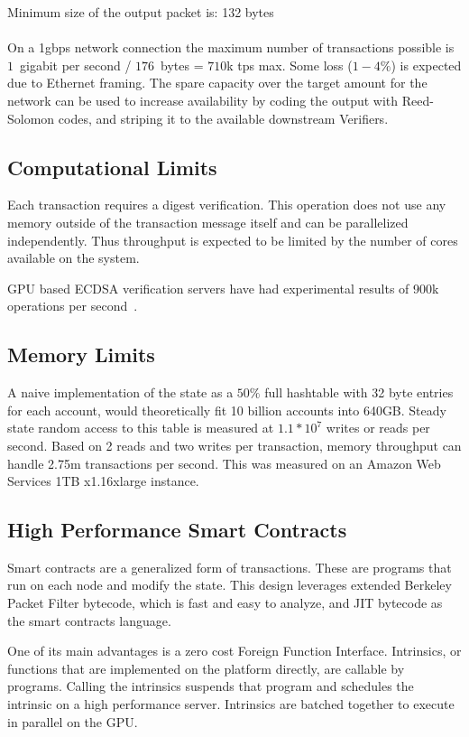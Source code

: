 \documentclass[12pt]{article}
\begin{document}
\noindent Minimum size of the output packet is: 132 bytes \\\\

On a 1gbps network connection the maximum number of transactions possible is $1$~gigabit per second / $176$~bytes = $710$k tps max. Some loss ($1-4\%$) is expected due to Ethernet framing. The spare capacity over the target amount for the network can be used to increase availability by coding the output with Reed-Solomon codes, and striping it to the available downstream Verifiers.
\subsection{Computational Limits}
Each transaction requires a digest verification. This operation does not use any memory outside of the transaction message itself and can be parallelized independently. Thus throughput is expected to be limited by the number of cores available on the system.

GPU based ECDSA verification servers have had experimental results of 900k operations per second~\cite{gpuecc}.
\subsection{Memory Limits}
A naive implementation of the state as a \(50\%\) full hashtable with 32 byte entries for each account, would theoretically fit 10 billion accounts into 640GB. Steady state random access to this table is measured at \(1.1 * 10^7\) writes or reads per second. Based on 2 reads and two writes per transaction, memory throughput can handle 2.75m transactions per second. This was measured on an Amazon Web Services 1TB x1.16xlarge instance.

\subsection{High Performance Smart Contracts}\label{sec:smartcontracts}

Smart contracts are a generalized form of transactions. These are programs that run on each node and modify the state. This design leverages extended Berkeley Packet Filter bytecode, which is fast and easy to analyze, and JIT bytecode as the smart contracts language.

One of its main advantages is a zero cost Foreign Function Interface. Intrinsics, or  functions that are implemented on the platform directly, are callable by  programs. Calling the intrinsics suspends that program and schedules the intrinsic on a high performance server. Intrinsics are batched together to execute in parallel on the GPU.
\end{document}
